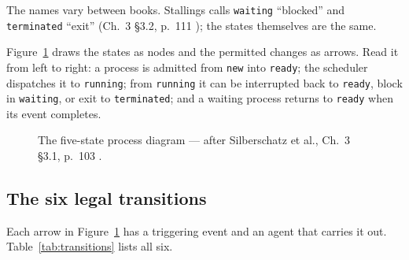 \documentclass[11pt]{article}
\begin{document}
The names vary between books. Stallings calls \texttt{waiting} ``blocked'' and
\texttt{terminated} ``exit'' (Ch.~3 \S3.2, p.~111
\cite{StallingsOS_internals_design_principles}); the states themselves are the
same.

Figure~\ref{fig:five-state} draws the states as nodes and the permitted changes
as arrows. Read it from left to right: a process is admitted from
\texttt{new} into \texttt{ready}; the scheduler dispatches it to
\texttt{running}; from \texttt{running} it can be interrupted back to
\texttt{ready}, block in \texttt{waiting}, or exit to \texttt{terminated}; and
a waiting process returns to \texttt{ready} when its event completes.

\begin{figure}[h]
\centering
{}
\caption{The five-state process diagram --- after Silberschatz et al., Ch.~3
\S3.1, p.~103 \cite{SilberschatzOSC_operating_system_concepts}.}
\label{fig:five-state}
\end{figure}

\subsection{The six legal transitions}

Each arrow in Figure~\ref{fig:five-state} has a triggering event and an agent
that carries it out. Table~\ref{tab:transitions} lists all six.
\end{document}
